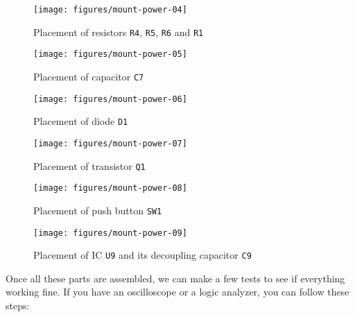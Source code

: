 \begin{figure}[htbp]
  \centering
  \texttt{[image: figures/mount-power-04]}
  \caption{Placement of resistors {\tt R4}, {\tt R5}, {\tt R6} and {\tt R1}}
  \label{fig:mount-power-04}
\end{figure}

\begin{figure}[htbp]
  \centering
  \texttt{[image: figures/mount-power-05]}
  \caption{Placement of capacitor {\tt C7}}
  \label{fig:mount-power-05}
\end{figure}

\begin{figure}[htbp]
  \centering
  \texttt{[image: figures/mount-power-06]}
  \caption{Placement of diode {\tt D1}}
  \label{fig:mount-power-06}
\end{figure}

\begin{figure}[htbp]
  \centering
  \texttt{[image: figures/mount-power-07]}
  \caption{Placement of transistor {\tt Q1}}
  \label{fig:mount-power-07}
\end{figure}

\begin{figure}[htbp]
  \centering
  \texttt{[image: figures/mount-power-08]}
  \caption{Placement of push button {\tt SW1}}
  \label{fig:mount-power-08}
\end{figure}

\begin{figure}[htbp]
  \centering
  \texttt{[image: figures/mount-power-09]}
  \caption{Placement of IC {\tt U9} and its decoupling capacitor {\tt C9}}
  \label{fig:mount-power-09}
\end{figure}

Once all these parts are assembled, we can make a few tests to see if everything working fine. If you have an oscilloscope or a logic analyzer, you can follow these steps:

